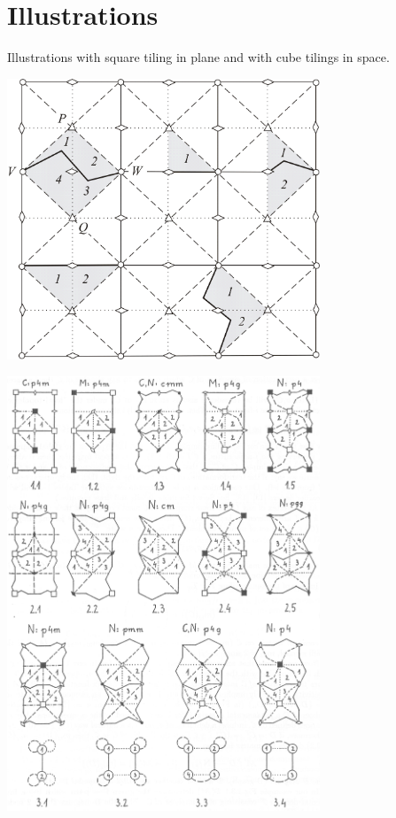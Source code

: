 \section{Illustrations}
\begin{frame}
  Illustrations with square tiling in plane and with cube tilings in space.

  \center\includegraphics[width=0.7\textwidth]{illustration3.png}
\end{frame}

\begin{frame}
  \includegraphics[width=0.7\textwidth]{illustration4.png}
\end{frame}

